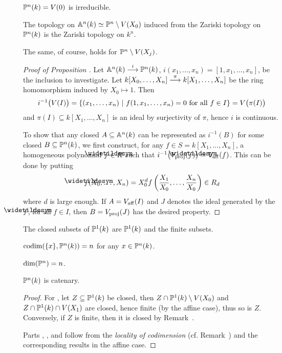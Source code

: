 \documentclass[a4paper,parskip=half,numbers=enddot, DIV=12, headheight=30pt]{scrreprt}
\begin{document}
\begin{cor*}
$\mathbb{P}^n(k) = V(0)$ is irreducible.
\end{cor*}
\begin{prop}
The topology on $\mathbb{A}^n(k) \simeq \mathbb{P}^n\setminus V(X_0)$ induced from the Zariski topology on $\mathbb{P}^n(k)$ is the Zariski topology on $k^n$.
\end{prop}
\begin{rem*}
The same, of course, holds for $\mathbb{P}^n\setminus V(X_j)$.
\end{rem*}
\begin{proof}[Proof of Proposition ]
Let $\IA^n(k)\morphism[i]\IP^n(k)$, $i(x_1,\ldots,x_n) = [1,x_1,\ldots,x_n]$, be the inclusion to investigate. Let $k[X_0,\ldots,X_n]\morphism[\pi]k[X_1,\ldots,X_n]$ be the ring homomorphism induced by $X_0\mapsto 1$. Then 
\begin{align*}
	i^{-1}\big(V(I)\big)=\left\{(x_1,\ldots,x_n) \ \middle|\  f(1,x_1,\ldots,x_n) = 0\text{ for all }f\in I\right\}=V\big(\pi(I)\big)
\end{align*}
and $\pi(I)\subseteq k[X_1,\ldots,X_n]$ is an ideal by surjectivity of $\pi$, hence $i$ is continuous.

To show that any closed $A\subseteq \mathbb{A}^n(k)$ can be represented as $i^{-1}(B)$ for some closed $B\subseteq \mathbb{P}^n(k)$, we first construct,
for any $f\in S = k[X_1,\ldots,X_n]$, a homogeneous polynomial $\snake f\in R$ such that $i^{-1}\big(V_\proj(\snake f)\big) = V_\aff(f)$.
This can be done by putting \begin{align*}
\snake f (X_0,\ldots,X_n)  = X_0^d f\left(\frac{X_1}{X_0},\ldots,\frac{X_n}{X_0}\right) \in R_d
\end{align*}
where $d$ is large enough. If $A = V_{\mathrm{aff}}(I)$ and $J$ denotes the ideal generated by the $\snake f$, for all $f\in I$,
then $B = V_{\mathrm{proj}}(J)$ has the desired property.
\end{proof}
\begin{cor}
\begin{alphanumerate}
\item The closed subsets of $\mathbb{P}^1(k)$ are $\mathbb{P}^1(k)$ and the finite subsets.
\item $\operatorname{codim}(\{x\},\mathbb{P}^n(k)) = n$ for any $x\in \mathbb{P}^n(k)$.
\item $\dim(\mathbb{P}^n)=n$.
\item $\mathbb{P}^n(k)$ is catenary.
\end{alphanumerate}
\end{cor}
\begin{proof}
	For , let $Z\subseteq\mathbb{P}^1(k)$ be closed, then $Z\cap\mathbb{P}^1(k)\setminus V(X_0)$ and $Z\cap \mathbb{P}^1(k)\cap V(X_1)$ are closed, hence finite (by the affine case), thus so is $Z$. Conversely, if $Z$ is finite, then it is closed by Remark~.
	
	Parts , , and  follow from the \emph{locality of codimension} (cf. Remark~) and the corresponding results in the affine case.
\end{proof}
\end{document}
